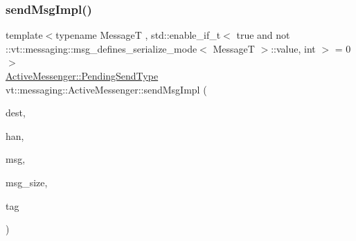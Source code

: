 \subsubsection{\texorpdfstring{send\+Msg\+Impl()}{sendMsgImpl()}\hspace{0.1cm}{\footnotesize\ttfamily [1/4]}}
{\footnotesize\ttfamily template$<$typename MessageT , std\+::enable\+\_\+if\+\_\+t$<$ true and not \+::vt\+::messaging\+::msg\+\_\+defines\+\_\+serialize\+\_\+mode$<$ Message\+T $>$\+::value, int $>$  = 0$>$ \\
\hyperlink{structvt_1_1messaging_1_1_active_messenger_a3626a6ca76d8ad4ec7c3b47a2c70d3a8}{Active\+Messenger\+::\+Pending\+Send\+Type} vt\+::messaging\+::\+Active\+Messenger\+::send\+Msg\+Impl (\begin{DoxyParamCaption}\item[{\hyperlink{namespacevt_a866da9d0efc19c0a1ce79e9e492f47e2}{Node\+Type}}]{dest,  }\item[{\hyperlink{namespacevt_af64846b57dfcaf104da3ef6967917573}{Handler\+Type}}]{han,  }\item[{\hyperlink{structvt_1_1messaging_1_1_msg_shared_ptr}{Msg\+Shared\+Ptr}$<$ MessageT $>$ \&}]{msg,  }\item[{\hyperlink{namespacevt_aab8d55968084610ce3b17057981e9300}{Byte\+Type}}]{msg\+\_\+size,  }\item[{\hyperlink{namespacevt_a84ab281dae04a52a4b243d6bf62d0e52}{Tag\+Type}}]{tag }\end{DoxyParamCaption})\hspace{0.3cm}{\ttfamily [inline]}}

\mbox{\label{structvt_1_1messaging_1_1_active_messenger_a7f2e8867a9d967eb7f43df7d5c420775}} 
